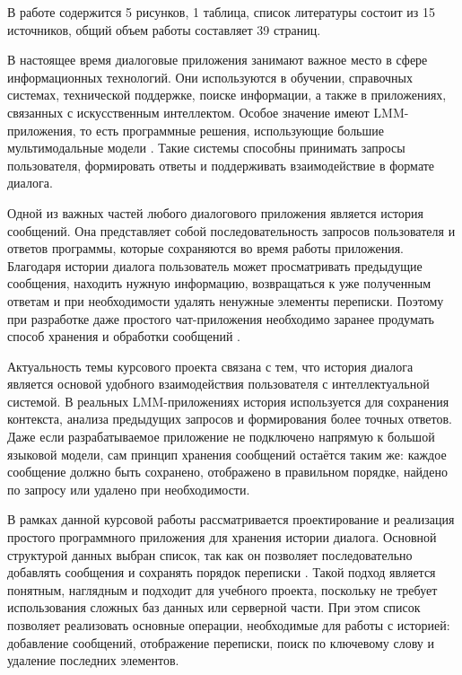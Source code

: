 \documentclass[12pt,a4paper]{article}
\begin{document}
В работе содержится 5 рисунков, 1 таблица, список литературы состоит из 15 источников, общий объем работы составляет 39 страниц.

\newpage
\tableofcontents
\newpage

\intro

В настоящее время диалоговые приложения занимают важное место в сфере информационных технологий. Они используются в обучении, справочных системах, технической поддержке, поиске информации, а также в приложениях, связанных с искусственным интеллектом. Особое значение имеют LMM-приложения, то есть программные решения, использующие большие мультимодальные модели \cite{ref12}. Такие системы способны принимать запросы пользователя, формировать ответы и поддерживать взаимодействие в формате диалога.

Одной из важных частей любого диалогового приложения является история сообщений. Она представляет собой последовательность запросов пользователя и ответов программы, которые сохраняются во время работы приложения. Благодаря истории диалога пользователь может просматривать предыдущие сообщения, находить нужную информацию, возвращаться к уже полученным ответам и при необходимости удалять ненужные элементы переписки. Поэтому при разработке даже простого чат-приложения необходимо заранее продумать способ хранения и обработки сообщений \cite{ref1}.

Актуальность темы курсового проекта связана с тем, что история диалога является основой удобного взаимодействия пользователя с интеллектуальной системой. В реальных LMM-приложениях история используется для сохранения контекста, анализа предыдущих запросов и формирования более точных ответов. Даже если разрабатываемое приложение не подключено напрямую к большой языковой модели, сам принцип хранения сообщений остаётся таким же: каждое сообщение должно быть сохранено, отображено в правильном порядке, найдено по запросу или удалено при необходимости.

В рамках данной курсовой работы рассматривается проектирование и реализация простого программного приложения для хранения истории диалога. Основной структурой данных выбран список, так как он позволяет последовательно добавлять сообщения и сохранять порядок переписки \cite{ref2}. Такой подход является понятным, наглядным и подходит для учебного проекта, поскольку не требует использования сложных баз данных или серверной части. При этом список позволяет реализовать основные операции, необходимые для работы с историей: добавление сообщений, отображение переписки, поиск по ключевому слову и удаление последних элементов.
\end{document}
